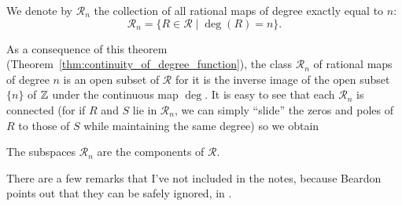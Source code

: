 \begin{definition}
    We denote by $\mathcal{R}_n$ the collection of all rational maps of degree
    exactly equal to $n$:
    \begin{equation*}
        \mathcal{R}_n = \{ R \in \mathcal{R} \mid \deg(R) = n \}.
    \end{equation*}
\end{definition}

As a consequence of this theorem
(Theorem~\ref{thm:continuity_of_degree_function}), the class $\mathcal{R}_n$ of
rational maps of degree $n$ is an open subset of $\mathcal{R}$ for it is the
inverse image of the open subset $\{n\}$ of $\mathbb{Z}$ under the continuous map
$\deg$. It is easy to see that each $\mathcal{R}_n$ is connected (for if $R$ and
$S$ lie in $\mathcal{R}_n$, we can simply \enquote{slide} the zeros and poles of
$R$ to those of $S$ while maintaining the same degree) so we obtain

\begin{corollary}
    The subspaces $\mathcal{R}_n$ are the components of $\mathcal{R}$.
\end{corollary}

There are a few remarks that I've not included in the notes, because Beardon
points out that they can be safely ignored, in \cite[47]{Beardon1991}.
